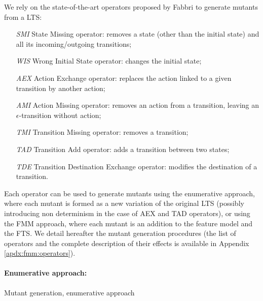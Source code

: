 We rely on the state-of-the-art operators proposed by Fabbri \etal \cite{Fabbri1999} to generate mutants from a LTS:
\begin{itemize}
\item[\emph{SMI}] State Missing operator: removes a state (other than the initial state) and all its incoming/outgoing transitions;
\item[\emph{WIS}] Wrong Initial State operator: changes the initial state;
\item[\emph{AEX}] Action Exchange operator: replaces the action linked to a given transition by another action;
\item[\emph{AMI}] Action Missing operator: removes an action from a transition, leaving an $\epsilon$-transition without action;
\item[\emph{TMI}] Transition Missing operator: removes a transition;
\item[\emph{TAD}] Transition Add operator: adds a transition between two states;
\item[\emph{TDE}] Transition Destination Exchange operator: modifies the destination of a transition.
\end{itemize}
%
Each operator can be used to generate mutants using the enumerative approach, where each mutant is formed as a new variation of the original LTS (possibly introducing non determinism in the case of AEX and TAD operators), or using the FMM approach, where each mutant is an addition to the feature model and the FTS. We detail hereafter the mutant generation procedures (the list of operators and the complete description of their effects is available in Appendix \ref{apdx:fmm:operators}).

\paragraph{Enumerative approach:}

\begin{algorithm}
	\caption{Mutant generation, enumerative approach}
 \label{algo:fmm:enumgen}
\end{algorithm}

